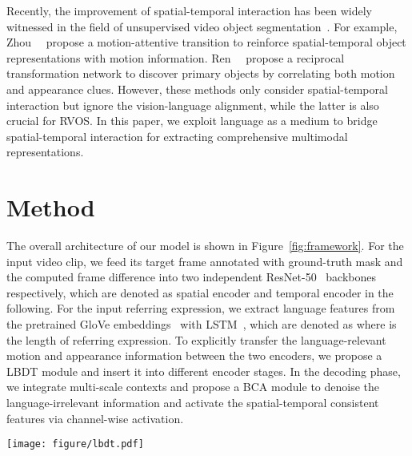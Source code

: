 \documentclass[10pt,twocolumn,letterpaper]{article}
\begin{document}
Recently, the improvement of spatial-temporal interaction has been widely witnessed in the field of unsupervised video object segmentation~\cite{zhou2020motion,ren2021reciprocal,fragkiadaki2015learning,li2018unsupervised,li2019motion,yan2019semi}.
For example, Zhou~\etal~\cite{zhou2020motion} propose a motion-attentive transition to reinforce spatial-temporal object representations with motion information.
Ren~\etal~\cite{ren2021reciprocal} propose a reciprocal transformation network to discover primary objects by correlating both motion and appearance clues. However, these methods only consider spatial-temporal interaction but ignore the vision-language alignment, while the latter is also crucial for RVOS.
In this paper, we exploit language as a medium to bridge spatial-temporal interaction for extracting comprehensive multimodal representations. 

\section{Method}
\label{sec:method}

The overall architecture of our model is shown in Figure~\ref{fig:framework}.
For the input video clip, we feed its target frame  annotated with ground-truth mask and the computed frame difference  into two independent ResNet-50~\cite{He2016CVPR} backbones respectively, which are denoted as spatial encoder and temporal encoder in the following.
For the input referring expression, we extract language features from the pretrained GloVe embeddings~\cite{pennington2014glove} with LSTM~\cite{hochreiter1997long}, which are denoted as  where  is the length of referring expression. To explicitly transfer the language-relevant motion and appearance information between the two encoders, we propose a LBDT module and insert it into different encoder stages. In the decoding phase, we integrate multi-scale contexts and propose a BCA module to denoise the language-irrelevant information and activate the spatial-temporal consistent features via channel-wise activation.


\begin{figure*}[t]
	\centering
		\texttt{[image: figure/lbdt.pdf]}
	\caption{Illustration of the \textit{temporal}\textit{language}\textit{spatial} information transfer process in our proposed LBDT module. The language-relevant motion information from the temporal features  is aggregated into the language medium , from which each pixel in the spatial features  can select the cross-modal motion information according to the semantic relevance. The \textit{spatial}\textit{language}\textit{temporal} information transfer process is conducted similarly.}
\label{fig:lbdt}
	
\end{figure*}
\end{document}
